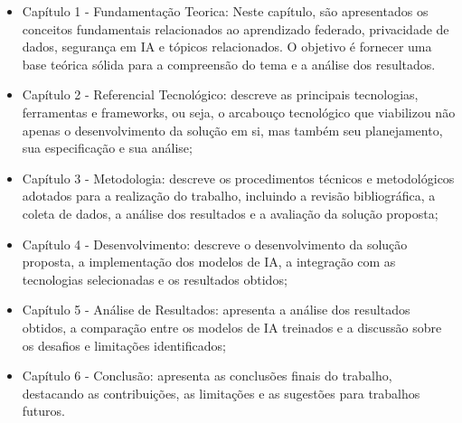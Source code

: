 \begin{itemize}
    \item Capítulo 1 - Fundamentação Teorica: Neste capítulo, são apresentados os conceitos fundamentais relacionados ao aprendizado federado, privacidade de dados, segurança em IA e tópicos relacionados. O objetivo é fornecer uma base teórica sólida para a compreensão do tema e a análise dos resultados.
    \item Capítulo 2 - Referencial Tecnológico: descreve as principais tecnologias, ferramentas e frameworks, ou seja, o arcabouço tecnológico que viabilizou não apenas o desenvolvimento da solução em si, mas também seu planejamento, sua especificação e sua análise;
    \item Capítulo 3 - Metodologia: descreve os procedimentos técnicos e metodológicos adotados para a realização do trabalho, incluindo a revisão bibliográfica, a coleta de dados, a análise dos resultados e a avaliação da solução proposta;
    \item Capítulo 4 - Desenvolvimento: descreve o desenvolvimento da solução proposta, a implementação dos modelos de IA, a integração com as tecnologias selecionadas e os resultados obtidos;
    \item Capítulo 5 - Análise de Resultados: apresenta a análise dos resultados obtidos, a comparação entre os modelos de IA treinados e a discussão sobre os desafios e limitações identificados;
    \item Capítulo 6 - Conclusão: apresenta as conclusões finais do trabalho, destacando as contribuições, as limitações e as sugestões para trabalhos futuros.
\end{itemize}